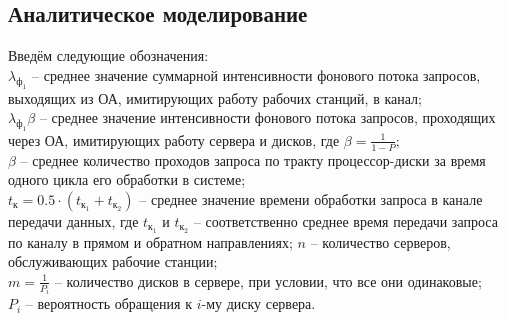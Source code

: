 \newpage

\subsection{Аналитическое моделирование}

Введём следующие обозначения: \\
$\lambda_{\text{ф}_1}$ -- среднее значение суммарной интенсивности фонового потока запросов, выходящих из ОА, имитирующих работу рабочих станций, в канал; \\
$\lambda_{\text{ф}_1}\beta$ -- среднее значение интенсивности фонового потока запросов, проходящих через ОА, имитирующих работу сервера и дисков, где $\beta=\frac{1}{1 - P}$; \\
$\beta$ -- среднее количество проходов запроса по тракту процессор-диски за время одного цикла его обработки в системе; \\
$t_{\text{к}} = 0.5\cdot(t_{\text{к}_1} + t_{\text{к}_2})$ -- среднее значение времени обработки запроса в канале передачи данных, где $t_{\text{к}_1}$ и $t_{\text{к}_2}$ -- соответственно среднее время передачи запроса по каналу в прямом и обратном направлениях;
$n$ -- количество серверов, обслуживающих рабочие станции; \\
$m = \frac{1}{P_i}$ -- количество дисков в сервере, при условии, что все они одинаковые; \\
$P_i$ -- вероятность обращения к $i$-му диску сервера.\par\bigskip

